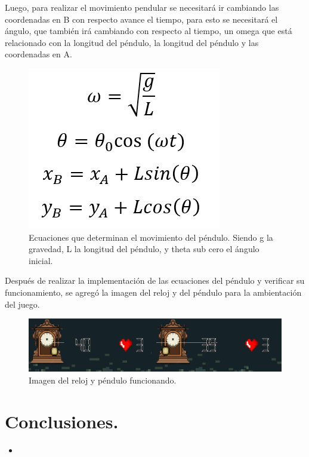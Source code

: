 \documentclass{article}
\begin{document}
Luego, para realizar el movimiento pendular se necesitará ir cambiando las coordenadas en B con respecto avance el tiempo, para esto se necesitará el ángulo, que también irá cambiando con respecto al tiempo, un omega que está relacionado con la longitud del péndulo, la longitud del péndulo y las coordenadas en A.

\begin{figure}[h]
\includegraphics[scale=1]{Images/ecuacion2.png}
\centering
\caption{Ecuaciones que determinan el movimiento del péndulo. Siendo g la gravedad, L la longitud del péndulo, y theta sub cero el ángulo inicial.}
\label{fig:ecu1}
\end{figure}

Después de realizar la implementación de las ecuaciones del péndulo y verificar su funcionamiento, se agregó la imagen del reloj y del péndulo para la ambientación del juego.

\begin{figure}[h]
\includegraphics[scale=0.7]{Images/barra.png}
\centering
\caption{Imagen del reloj y péndulo funcionando.}
\label{fig:penduloreloj}
\end{figure}


\section{Conclusiones.}
    \begin{itemize}
        \item
    \end{itemize}
\end{document}
